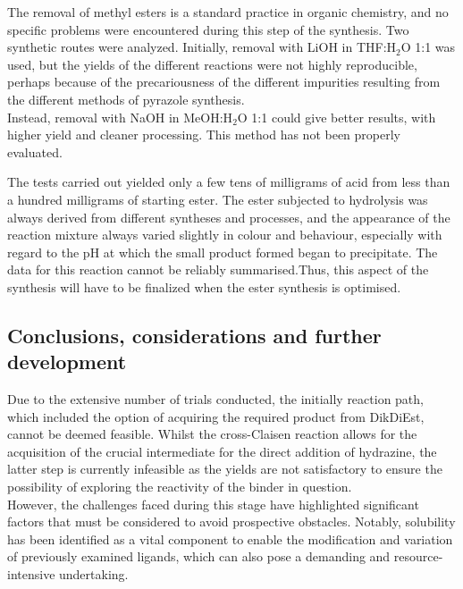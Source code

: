 \documentclass[../Master.tex]{subfiles}
\begin{document}
The removal of methyl esters is a standard practice in organic chemistry, and no specific problems were encountered during this step of the synthesis. Two synthetic routes were analyzed.
Initially, removal with LiOH in THF:H$_2$O 1:1 was used, but the yields of the different reactions were not highly reproducible, perhaps because of the precariousness of the different impurities resulting from the different methods of pyrazole synthesis. \\
Instead, removal with NaOH in MeOH:H$_{2}$O 1:1 could give better results, with higher yield and cleaner processing. This method has not been properly evaluated.

The tests carried out yielded only a few tens of milligrams of acid from less than a hundred milligrams of starting ester. The ester subjected to hydrolysis was always derived from different syntheses and processes, and the appearance of the reaction mixture always varied slightly in colour and behaviour, especially with regard to the pH at which the small product formed began to precipitate.
The data for this reaction cannot be reliably summarised.Thus, this aspect of the synthesis will have to be finalized when the ester synthesis is optimised.

\subsection{Conclusions, considerations and further development}

Due to the extensive number of trials conducted, the initially reaction path, which included the option of acquiring the required product from DikDiEst, cannot be deemed feasible. Whilst the cross-Claisen reaction allows for the acquisition of the crucial intermediate for the direct addition of hydrazine, the latter step is currently infeasible as the yields are not satisfactory to ensure the possibility of exploring the reactivity of the binder in question.\\
However, the challenges faced during this stage have highlighted significant factors that must be considered to avoid prospective obstacles. Notably, solubility has been identified as a vital component to enable the modification and variation of previously examined ligands, which can also pose a demanding and resource-intensive undertaking.
\end{document}
